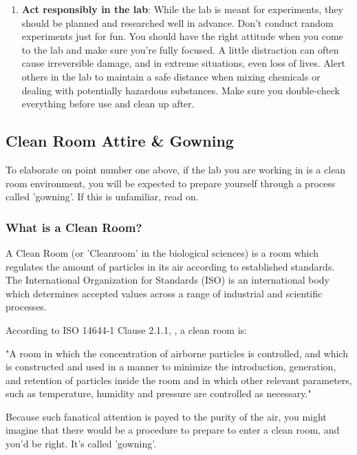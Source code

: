 \documentclass[11pt]{article}
\begin{document}
\begin{enumerate}[noitemsep]
  \item \textbf{Act responsibly in the lab}: While the lab is meant for experiments, they should be planned and researched well in advance. Don’t conduct random experiments just for fun. You should have the right attitude when you come to the lab and make sure you’re fully focused. A little distraction can often cause irreversible damage, and in extreme situations, even loss of lives. Alert others in the lab to maintain a safe distance when mixing chemicals or dealing with potentially hazardous substances. Make sure you double-check everything before use and clean up after.
\end{enumerate}

\subsection{Clean Room Attire \& Gowning}

To elaborate on point number one above, if the lab you are working in is a clean room environment, you will be expected to prepare yourself through a process called 'gowning'. If this is unfamiliar, read on.

\subsubsection{What is a Clean Room?}

A Clean Room (or 'Cleanroom' in the biological sciences) is a room which regulates the amount of particles in its air according to established standards. The International Organization for Standards (ISO) is an international body which determines accepted values across a range of industrial and scientific processes. 

According to ISO 14644-1 Clause 2.1.1, \cite{website:ISO99}, a clean room is:

\begin{displayquote}
    "A room in which the concentration of airborne particles is controlled, and which is constructed and used in a manner to minimize the introduction, generation, and retention of particles inside the room and in which other relevant parameters, such as temperature, humidity and pressure are controlled as necessary." 
\end{displayquote}

Because such fanatical attention is payed to the purity of the air, you might imagine that there would be a procedure to prepare to enter a clean room, and you'd be right. It's called 'gowning'.
\end{document}
